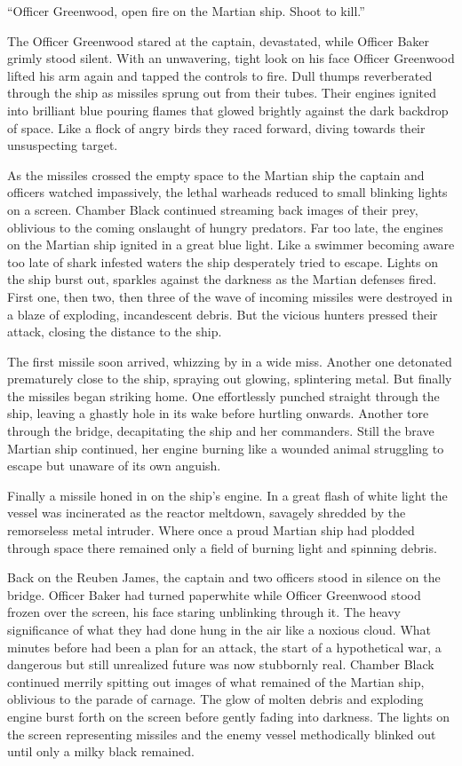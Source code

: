 \documentclass[12pt]{article} %
\begin{document}
``Officer Greenwood, open fire on the Martian ship. Shoot to kill.''

The Officer Greenwood stared at the captain, devastated, while Officer Baker grimly stood silent. With an unwavering, tight look on his face Officer Greenwood lifted his arm again and tapped the controls to fire. Dull thumps reverberated through the ship as missiles sprung out from their tubes. Their engines ignited into brilliant blue pouring flames that glowed brightly against the dark backdrop of space. Like a flock of angry birds they raced forward, diving towards their unsuspecting target.

As the missiles crossed the empty space to the Martian ship the captain and officers watched impassively, the lethal warheads reduced to small blinking lights on a screen. Chamber Black continued streaming back images of their prey, oblivious to the coming onslaught of hungry predators. Far too late, the engines on the Martian ship ignited in a great blue light. Like a swimmer becoming aware too late of shark infested waters the ship desperately tried to escape. Lights on the ship burst out, sparkles against the darkness as the Martian defenses fired. First one, then two, then three of the wave of incoming missiles were destroyed in a blaze of exploding, incandescent debris. But the vicious hunters pressed their attack, closing the distance to the ship.

The first missile soon arrived, whizzing by in a wide miss. Another one detonated prematurely close to the ship, spraying out glowing, splintering metal. But finally the missiles began striking home. One effortlessly punched straight through the ship, leaving a ghastly hole in its wake before hurtling onwards. Another tore through the bridge, decapitating the ship and her commanders. Still the brave Martian ship continued, her engine burning like a wounded animal struggling to escape but unaware of its own anguish.

Finally a missile honed in on the ship's engine. In a great flash of white light the vessel was incinerated as the reactor meltdown, savagely shredded by the remorseless metal intruder. Where once a proud Martian ship had plodded through space there remained only a field of burning light and spinning debris.

Back on the Reuben James, the captain and two officers stood in silence on the bridge. Officer Baker had turned paperwhite while Officer Greenwood stood frozen over the screen, his face staring unblinking through it. The heavy significance of what they had done hung in the air like a noxious cloud. What minutes before had been a plan for an attack, the start of a hypothetical war, a dangerous but still unrealized future was now stubbornly real. Chamber Black continued merrily spitting out images of what remained of the Martian ship, oblivious to the parade of carnage. The glow of molten debris and exploding engine burst forth on the screen before gently fading into darkness. The lights on the screen representing missiles and the enemy vessel methodically blinked out until only a milky black remained.
\end{document}
